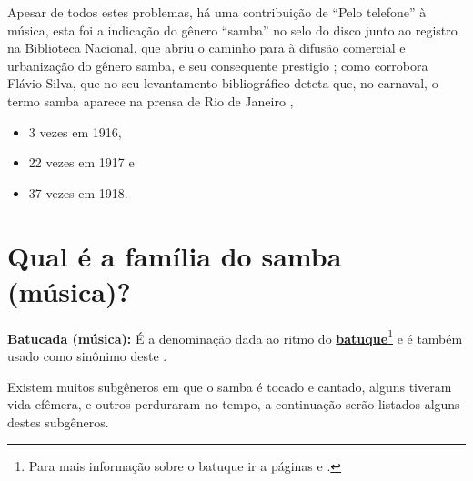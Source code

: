 Apesar de todos estes problemas, há uma contribuição de ``Pelo telefone'' à música, 
esta foi a indicação do gênero ``samba'' no selo do disco junto ao registro na Biblioteca Nacional,
que abriu o caminho para à difusão comercial e urbanização do gênero samba,
 e seu consequente prestigio \cite{musicapelotelefone} \cite[pp. 49]{diniz2008almanaque};
como corrobora Flávio Silva, que no seu levantamento bibliográfico deteta que, no carnaval, o termo
samba aparece na prensa  de Rio de Janeiro \cite[pp. 118]{sandroni2001feitico}, 
\begin{itemize}
\item 3 vezes em 1916, 
\item 22 vezes em 1917 e
\item 37 vezes em 1918.
\end{itemize}

\section{Qual é a família do samba (música)?}
\begin{remarcar}
\textbf{Batucada (música):} É a denominação dada ao ritmo do 
\hyperref[ref:batuquedanca]{\textbf{batuque}}\footnote{Para 
mais informação sobre o batuque ir a páginas \pageref{ref:batuquedanca1800} e \pageref{ref:batuquedanca}.} 
e é também usado como sinônimo deste \cite[pp. 89]{marcondes1977enciclopedia}.
\end{remarcar}
Existem muitos subgêneros em que o samba é tocado e cantado, alguns tiveram vida efêmera,
e outros perduraram no tempo, a continuação serão listados alguns destes subgêneros.

